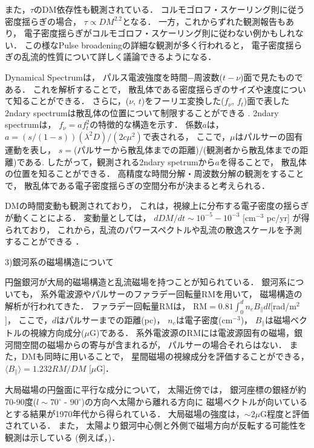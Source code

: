 また，$\tau$のDM依存性も観測されている．
コルモゴロフ・スケーリング則に従う密度揺らぎの場合，
$\tau \propto DM^{2.2}$となる\cite{RNB1986}．
一方，これからずれた観測報告もあり，
電子密度揺らぎがコルモゴロフ・スケーリング則に従わない例かもしれない\cite{BHAT2004}．
この様なPulse broadeningの詳細な観測が多く行われると，
電子密度揺らぎの乱流的性質について詳しく議論できるようになる．

Dynamical Spectrumは，
パルス電波強度を時間$-$周波数($t-\nu$)面で見たものである．
これを解析することで，
散乱体である密度揺らぎのサイズや速度について知ることができる．
さらに，($\nu$, $t$)をフーリエ変換した($f_\nu$, $f_t$)面で表した
2ndary spectrumは散乱体の位置について制限することができる
\cite{ST2006}.
2ndary spectrumは，
$f_\nu = a f_t^2$の特徴的な構造を示す．
係数$a$は，$a=(s/(1-s))(\lambda^2 D)/(2 c \mu^2)$で表される，
ここで，$\mu$はパルサーの固有運動を表し，
$s=$(パルサーから散乱体までの距離)/(観測者から散乱体までの距離)である.
したがって，観測される2ndary spetrumから$a$を得ることで，
散乱体の位置を知ることができる．
高精度な時間分解・周波数分解の観測をすることで，
散乱体である電子密度揺らぎの空間分布が決まると考えられる．

DMの時間変動も観測されており，
これは，視線上に分布する電子密度の揺らぎが動くことによる．
変動量としては，
$dDM/dt \sim 10^{-5} - 10^{-3}$ [cm$^{-3}$ pc/yr]
が得られており，
これから，乱流のパワースペクトルや乱流の散逸スケールを予測することができる
\cite{YOU2007}．


3)銀河系の磁場構造について

円盤銀河が大局的磁場構造と乱流磁場を持つことが知られている．
銀河系についても，
系外電波源やパルサーのファラデー回転量RMを用いて，
磁場構造の解析が行われてきた．
ファラデー回転量RMは，
$ \textrm{RM} = 0.81 \int_0^d n_e B_\parallel dl$[rad/m$^2$]，
ここで，$d$はパルサーまでの距離(pc)，
$n_e$は電子密度(cm$^{-3}$)，
$B_\parallel$は磁場ベクトルの視線方向成分($\mu$G)である．
系外電波源のRMには電波源固有の磁場，銀河間空間の磁場からの寄与が含まれるが，
パルサーの場合それらはない．
また，DMも同時に用いることで，
星間磁場の視線成分を評価することができる，
$\langle B_\parallel \rangle = 1.232 RM/DM$ [$\mu$G]．

大局磁場の円盤面に平行な成分について，
太陽近傍では，
銀河座標の銀経が約70-90度($l \sim 70^\circ$ - $90^\circ$)の方向へ太陽から離れる方向に
磁場ベクトルが向いているとする結果が1970年代から得られている．
大局磁場の強度は，$\sim 2 \mu$G程度と評価されている．
また，
太陽より銀河中心側と外側で磁場方向が反転する可能性を観測は示している
(例えば，\cite{HAN2006})．

